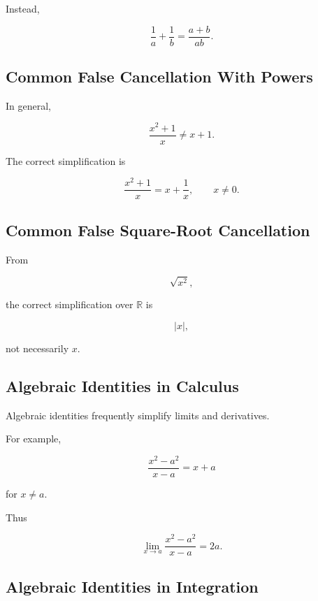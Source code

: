 Instead,

\[
\boxed{
\frac1a+\frac1b
=
\frac{a+b}{ab}.
}
\]

\subsection{Common False Cancellation With Powers}
\label{subsec:false-power-cancellation}

In general,

\[
\boxed{
\frac{x^2+1}{x}
\neq
x+1.
}
\]

The correct simplification is

\[
\boxed{
\frac{x^2+1}{x}
=
x+\frac1x,
\qquad
x\neq0.
}
\]

\subsection{Common False Square-Root Cancellation}
\label{subsec:false-square-root-cancellation}

From

\[
\sqrt{x^2},
\]

the correct simplification over \(\mathbb{R}\) is

\[
\boxed{
|x|,
}
\]

not necessarily \(x\).

\subsection{Algebraic Identities in Calculus}
\label{subsec:algebraic-identities-calculus}

Algebraic identities frequently simplify limits and derivatives.

For example,

\[
\frac{x^2-a^2}{x-a}
=
x+a
\]

for \(x\neq a\).

Thus

\[
\boxed{
\lim_{x\to a}
\frac{x^2-a^2}{x-a}
=
2a.
}
\]

\subsection{Algebraic Identities in Integration}
\label{subsec:algebraic-identities-integration}

